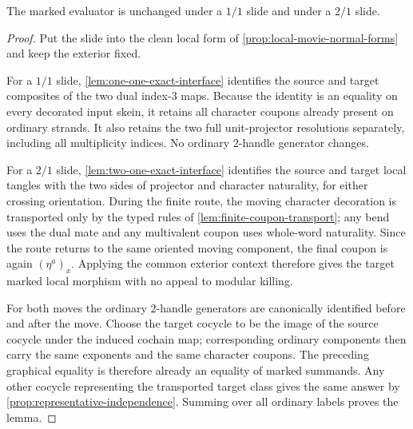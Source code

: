 \begin{lemma}
\label{lem:dotted-handle-slides}
The marked evaluator is unchanged under a $1/1$ slide and under a $2/1$
slide.
\end{lemma}

\begin{proof}
Put the slide into the clean local form of
\cref{prop:local-movie-normal-forms} and keep the exterior fixed.

For a $1/1$ slide, \cref{lem:one-one-exact-interface} identifies the
source and target composites of the two dual index-$3$ maps.  Because the
identity is an equality on every decorated input skein, it retains all
character coupons already present on ordinary strands.  It also retains the
two full unit-projector resolutions separately, including all multiplicity
indices.  No ordinary $2$-handle generator changes.

For a $2/1$ slide, \cref{lem:two-one-exact-interface} identifies the
source and target local tangles with the two sides of projector and character
naturality, for either crossing orientation.  During the finite route, the
moving character decoration is transported only by the typed rules of
\cref{lem:finite-coupon-transport}; any bend uses the dual mate and any
multivalent coupon uses whole-word naturality.  Since the route returns to
the same oriented moving component, the final coupon is again
$(\eta^{a})_x$.  Applying the common exterior context therefore gives the
target marked local morphism with no appeal to modular killing.

For both moves the ordinary $2$-handle generators are canonically identified
before and after the move.  Choose the target cocycle to be the image of the
source cocycle under the induced cochain map; corresponding ordinary
components then carry the same exponents and the same character coupons.
The preceding graphical equality is therefore already an equality of marked
summands.  Any other cocycle representing the transported target class gives
the same answer by \cref{prop:representative-independence}.  Summing over all
ordinary labels proves the lemma.
\end{proof}

